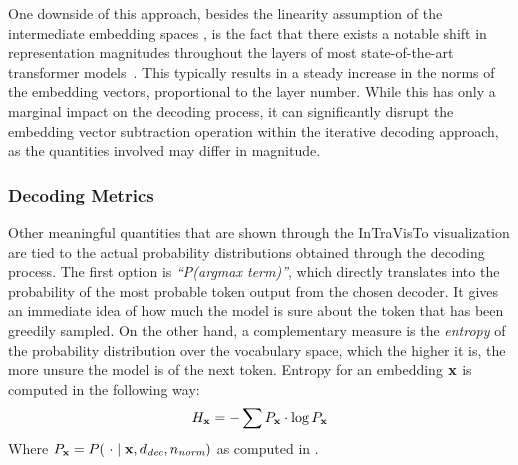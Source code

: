 One downside of this approach, besides the linearity assumption of the intermediate embedding spaces , is the fact that there exists a notable shift in representation magnitudes throughout the layers of most state-of-the-art transformer models~\cite{heimersheim2023}.
This typically results in a steady increase in the norms of the embedding vectors, proportional to the layer number.
While this has only a marginal impact on the decoding process, it can significantly disrupt the embedding vector subtraction operation within the iterative decoding approach, as the quantities involved may differ in magnitude.

\subsubsection{Decoding Metrics}

Other meaningful quantities that are shown through the InTraVisTo visualization are tied to the actual probability distributions obtained through the decoding process.
The first option is \emph{``P(argmax term)''}, which directly translates into the probability of the most probable token output from the chosen decoder.
It gives an immediate idea of how much the model is sure about the token that has been greedily sampled.
On the other hand, a complementary measure is the \emph{entropy} of the probability distribution over the vocabulary space, which the higher it is, the more unsure the model is of the next token.
Entropy for an embedding $\bm{\mathbf{x}}$ is computed in the following way:
\begin{equation}
    \label{eq:method_intravisto_entropy}
    H_{\bm{\mathbf{x}}} = -\sum{P_{\bm{\mathbf{x}}} \cdot \log{P_{\bm{\mathbf{x}}}}}
\end{equation}
Where $P_{\bm{\mathbf{x}}} = P(\ \cdot \mid \bm{\mathbf{x}}, d_\textit{dec}, n_\textit{norm})$ as computed in .

